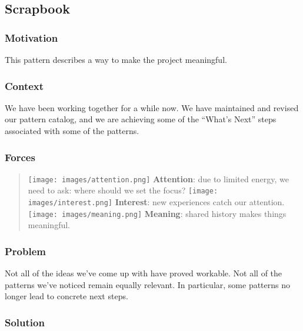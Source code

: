 \hypertarget{scrapbook}{%
\subsection{Scrapbook}\label{scrapbook}}

\hypertarget{motivation}{%
\subsubsection{Motivation}\label{motivation}}

This pattern describes a way to make the project meaningful.

\hypertarget{context}{%
\subsubsection{Context}\label{context}}

We have been working together for a while now. We have maintained and
revised our pattern catalog, and we are achieving some of the ``What's
Next'' steps associated with some of the patterns.

\hypertarget{forces}{%
\subsubsection{Forces}\label{forces}}

\begin{quote}
\texttt{[image: images/attention.png]} \textbf{Attention}: due to
limited energy, we need to ask: where should we set the focus?
\texttt{[image: images/interest.png]} \textbf{Interest}: new experiences
catch our attention. \texttt{[image: images/meaning.png]}
\textbf{Meaning}: shared history makes things meaningful.
\end{quote}

\hypertarget{problem}{%
\subsubsection{Problem}\label{problem}}

Not all of the ideas we've come up with have proved workable. Not all of
the patterns we've noticed remain equally relevant. In particular, some
patterns no longer lead to concrete next steps.

\hypertarget{solution}{%
\subsubsection{Solution}\label{solution}}

